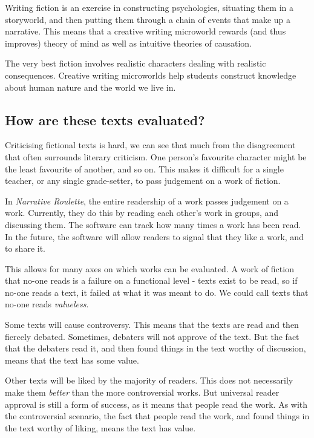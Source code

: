 Writing fiction is an exercise in constructing psychologies, situating
them in a storyworld, and then putting them through a chain of events
that make up a narrative. This means that a creative writing microworld
rewards (and thus improves) theory of mind as well as intuitive theories
of causation.

The very best fiction involves realistic characters dealing with
realistic consequences. Creative writing microworlds help students
construct knowledge about human nature and the world we live in.

\subsection{How are these texts evaluated?}

Criticising fictional texts is hard, we can see that much from the
disagreement that often surrounds literary criticism. One person's
favourite character might be the least favourite of another, and so on.
This makes it difficult for a single teacher, or any single
grade-setter, to pass judgement on a work of fiction.

In \emph{Narrative Roulette}, the entire readership of a work passes
judgement on a work. Currently, they do this by reading each other's
work in groups, and discussing them. The software can track how many
times a work has been read. In the future, the software will allow
readers to signal that they like a work, and to share it.

This allows for many axes on which works can be evaluated. A work of
fiction that no-one reads is a failure on a functional level - texts
exist to be read, so if no-one reads a text, it failed at what it was
meant to do. We could call texts that no-one reads \emph{valueless}.

Some texts will cause controversy. This means that the texts are read
and then fiercely debated. Sometimes, debaters will not approve of the
text. But the fact that the debaters read it, and then found things in
the text worthy of discussion, means that the text has some value.

Other texts will be liked by the majority of readers. This does not
necessarily make them \emph{better} than the more controversial works.
But universal reader approval is still a form of success, as it means
that people read the work. As with the controversial scenario, the fact
that people read the work, and found things in the text worthy of
liking, means the text has value.


